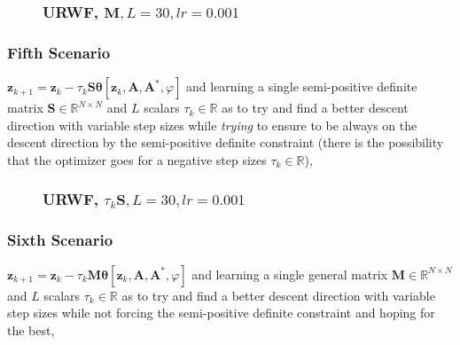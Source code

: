 \begin{frame}
  \begin{figure}
    \frametitle{URWF, $\boldsymbol{M},L=30,lr=0.001$}
    \centering
    \resizebox{0.9\textwidth}{!}{}
    \label{fig:rwf_s_02_l_30_lr_0.001}
  \end{figure}
\end{frame}




\begin{frame}
  \frametitle{Fifth Scenario}
  \begin{center}
    $\boldsymbol{z}_{k+1} = \boldsymbol{z}_k - \tau_k\boldsymbol{S}\boldsymbol{\theta}[\boldsymbol{z}_k,\boldsymbol{A},\boldsymbol{A^*},\varphi]$
    and learning a single semi-positive definite matrix $\boldsymbol{S}\in \mathbb{R}^{N \times N}$ and $L$ scalars $\tau_k \in \mathbb{R}$ as to try and find a 
    better descent direction with variable step sizes while \emph{trying} to ensure to be always on the descent direction by the 
    semi-positive definite constraint (there is the possibility that the optimizer goes for a negative step sizes $\tau_k \in \mathbb{R}$), 
  \end{center}  
\end{frame}

\begin{frame}
  \begin{figure}
    \frametitle{URWF, $\tau_k\boldsymbol{S},L=30,lr=0.001$}
    \centering
    \resizebox{0.9\textwidth}{!}{}
    \label{fig:rwf_s_05_l_30_lr_0.001}
  \end{figure}
\end{frame}




\begin{frame}
  \frametitle{Sixth Scenario}
  \begin{center}
    $\boldsymbol{z}_{k+1} = \boldsymbol{z}_k - \tau_k\boldsymbol{M}\boldsymbol{\theta}[\boldsymbol{z}_k,\boldsymbol{A},\boldsymbol{A^*},\varphi]$
    and learning a single general matrix $\boldsymbol{M}\in \mathbb{R}^{N \times N}$ and $L$ scalars $\tau_k \in \mathbb{R}$ as to try and find a 
    better descent direction with variable step sizes while not forcing the semi-positive definite constraint and hoping for the best, 
  \end{center}
  
\end{frame}

